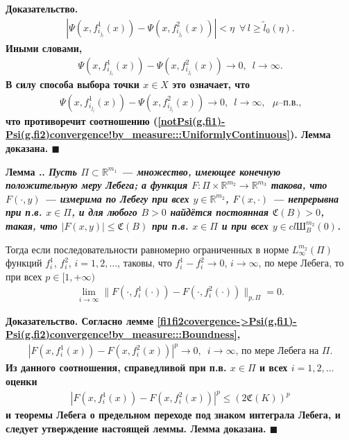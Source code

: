 \documentclass{report}
\newcounter{lem}[section]
\renewcommand{\thelem}{\thesection.\arabic{lem}}
\newenvironment{Lemma}{\par\refstepcounter{lem}\bf Лемма \thelem. \it}{\rm\par}
\newenvironment{Proof}{\par\noindent\bf Доказательство.\rm}{ $\blacksquare$\par}
\begin{document}
\begin{Proof}
\begin{gather*}
|\Psi(x,f_{i_{j_l}}^1(x))-\Psi(x,f_{i_{j_l}}^2(x))|<\eta\,\,\,\forall\,l\geqslant\tilde{l}_0(\eta).
\end{gather*}
Иными словами,
\begin{gather*}
\Psi(x,f_{i_{j_l}}^1(x))-\Psi(x,f_{i_{j_l}}^2(x))\to0,\,\,\,l\to\infty.
\end{gather*}
В силу способа выбора точки $x\in X$ это означает, что
\begin{gather*}
\Psi(x,f_{i_{j_l}}^1(x))-\Psi(x,f_{i_{j_l}}^2(x))\to0,\,\,\,l\to\infty,\text{ $\mu$--п.в.,}
\end{gather*}
что противоречит соотношению (\ref{notPsi(g,fi1)-Psi(g,fi2)convergence!by_measure:::UniformlyContinuous}). Лемма доказана.
\end{Proof}


\begin{Lemma}\label{fi1fi2covergence->Psi(g,fi1)-Psi(g,fi2)convergence}
Пусть $\Pi\subset\mathbb{R}^{m_1}$ --- множество, имеющее конечную положительную меру Лебега; а функция $F\colon \Pi\times\mathbb{R}^{m_2}\to\mathbb{R}^{m_3}$ такова, что $F(\cdot,y)$ ---
измерима по Лебегу при всех $y\in\mathbb{R}^{m_2}$, $F(x,\cdot)$ --- непрерывна при п.в. $x\in \Pi$, и для любого $B>0$ найдётся постоянная $\mathfrak{C}(B)>0$, такая, что
$|F(x,y)|\leqslant\mathfrak{C}(B)$ при п.в. $x\in\Pi$ и при всех $y\in cl{\textrm{Ш}_B^{m_2}(0)}$.

Тогда если последовательности равномерно ограниченных в норме $L_\infty^{m_2}(\Pi)$ функций $f_i^1$, $f^2_i$, $i=1,2,\dots$, таковы, что $f_i^1-f_i^2\to0$, $i\to\infty$, по мере Лебега, то
при всех $p\in[1,+\infty)$
\begin{gather*}
\lim\limits_{i\to\infty}\|F(\cdot,f_i^1(\cdot))-F(\cdot,f_i^2(\cdot))\|_{p,\Pi}=0.
\end{gather*}
\end{Lemma}
\begin{Proof}
Согласно лемме \ref{fi1fi2covergence->Psi(g,fi1)-Psi(g,fi2)convergence!by_measure:::Boundness},
\begin{gather*}
|F(x,f_i^1(x))-F(x,f_i^2(x))|^p\to0,\,\,\,\text{$i\to\infty$, по мере Лебега на $\Pi$}.
\end{gather*}
Из данного соотношения, справедливой при п.в. $x\in \Pi$ и всех $i=1,2,\dots$ оценки
\begin{gather*}
|F(x,f_i^1(x))-F(x,f_i^2(x))|^p\leqslant(2\mathfrak{C}(K))^p
\end{gather*}
и теоремы Лебега о предельном переходе под знаком интеграла Лебега, и следует утверждение настоящей леммы. Лемма доказана.
\end{Proof}
\end{document}

